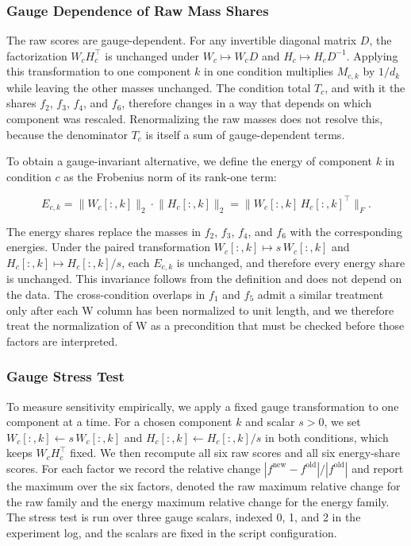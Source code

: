 \documentclass{article}
\begin{document}
\subsubsection{Gauge Dependence of Raw Mass Shares}

\label{sec:gauge_dependence_of_raw_mass_shares}

The raw scores are gauge-dependent. For any invertible diagonal matrix $D$, the factorization $W_c H_c^{\top}$ is unchanged under $W_c \mapsto W_c D$ and $H_c \mapsto H_c D^{-1}$. Applying this transformation to one component $k$ in one condition multiplies $M_{c,k}$ by $1/d_k$ while leaving the other masses unchanged. The condition total $T_c$, and with it the shares $f_2$, $f_3$, $f_4$, and $f_6$, therefore changes in a way that depends on which component was rescaled. Renormalizing the raw masses does not resolve this, because the denominator $T_c$ is itself a sum of gauge-dependent terms.

To obtain a gauge-invariant alternative, we define the energy of component $k$ in condition $c$ as the Frobenius norm of its rank-one term:

\begin{equation}
E_{c,k} = \lVert W_c[:,k] \rVert_2 \cdot \lVert H_c[:,k] \rVert_2 = \lVert W_c[:,k]\, H_c[:,k]^{\top} \rVert_F.
\end{equation}

The energy shares replace the masses in $f_2$, $f_3$, $f_4$, and $f_6$ with the corresponding energies. Under the paired transformation $W_c[:,k] \mapsto s\,W_c[:,k]$ and $H_c[:,k] \mapsto H_c[:,k]/s$, each $E_{c,k}$ is unchanged, and therefore every energy share is unchanged. This invariance follows from the definition and does not depend on the data. The cross-condition overlaps in $f_1$ and $f_5$ admit a similar treatment only after each W column has been normalized to unit length, and we therefore treat the normalization of W as a precondition that must be checked before those factors are interpreted.

\subsubsection{Gauge Stress Test}

\label{sec:gauge_stress_test}

To measure sensitivity empirically, we apply a fixed gauge transformation to one component at a time. For a chosen component $k$ and scalar $s > 0$, we set $W_c[:,k] \leftarrow s\,W_c[:,k]$ and $H_c[:,k] \leftarrow H_c[:,k]/s$ in both conditions, which keeps $W_c H_c^{\top}$ fixed. We then recompute all six raw scores and all six energy-share scores. For each factor we record the relative change $|f^{\text{new}} - f^{\text{old}}| / |f^{\text{old}}|$ and report the maximum over the six factors, denoted the raw maximum relative change for the raw family and the energy maximum relative change for the energy family. The stress test is run over three gauge scalars, indexed 0, 1, and 2 in the experiment log, and the scalars are fixed in the script configuration.
\end{document}
